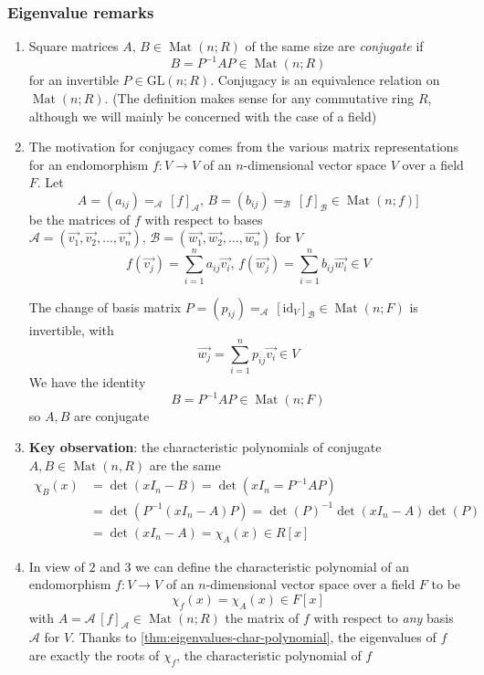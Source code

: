 \documentclass{article}
\DeclareMathOperator{\Mat}{Mat}
\begin{document}
\subsubsection{Eigenvalue remarks}
\begin{enumerate}
    \item Square matrices $A,\,B\in \Mat(n;R)$ of the same size are \textit{conjugate} if
        \[B = P^{-1}AP\in \Mat(n;R)\]
    for an invertible $P\in \text{GL}(n;R)$. Conjugacy is an equivalence relation on $\Mat(n;R)$. (The definition makes sense for any commutative ring $R$, although we will mainly be concerned with the case of a field)
    \item The motivation for conjugacy comes from the various matrix representations for an endomorphism $f : V \to V$ of an $n$-dimensional vector space $V$ over a field $F$. Let
        \[A = (a_{ij}) =_{\mathcal{A}}\,[f]_{\mathcal{A}},\,B = (b_{ij}) =_{\mathcal{B}}\,[f]_{\mathcal{B}}\in \Mat(n;f)]\]
        be the matrices of $f$ with respect to bases $\mathcal{A} = (\vec{v_{1}}, \vec{v_{2}},\dots,\vec{v_{n}}),\,\mathcal{B} = (\vec{w_{1}}, \vec{w_{2}},\dots,\vec{w_{n}})$ for $V$
        \[f(\vec{v_{j}}) = \sum_{i = 1}^{n}a_{ij}\vec{v_{i}},\,f(\vec{w_{j}}) = \sum_{i = 1}^{n}b_{ij}\vec{w_{i}}\in V\]

        The change of basis matrix $P = (p_{ij}) =_{\mathcal{A}}\, [\text{id}_{V}]_{\mathcal{B}}\in \Mat(n;F)$ is invertible, with
        \[\vec{w_{j}} = \sum_{i = 1}^{n}p_{ij}\vec{v_{i}}\in V\]
        We have the identity
        \[B = P^{-1}AP\in \Mat(n;F)\]
        so $A,B$ are conjugate
    \item \textbf{Key observation}: the characteristic polynomials of conjugate $A,B\in \Mat(n,R)$ are the same
        \begin{align*}
            \chi_{B}(x) &= \det(x I_{n} - B) = \det(x I_{n} = P^{-1}AP) \\
            &= \det(P^{-1}(x I_{n} - A)P) = \det(P)^{-1}\det(x I_{n} - A)\det(P) \\
            &= \det(xI_{n} - A) = \chi_{A}(x)\in R[x]
        \end{align*}
    \item In view of $2$ and $3$ we can define the characteristic polynomial of an endomorphism $f : V\to V$ of an $n$-dimensional vector space over a field $F$ to be
        \[\chi_{f}(x) = \chi_{A}(x)\in F[x]\]
        with $A =\mathcal{A}\,[f]_{\mathcal{A}}\in \Mat(n;R)$ the matrix of $f$ with respect to \textit{any} basis $\mathcal{A}$ for $V$. Thanks to \ref{thm:eigenvalues-char-polynomial}, the eigenvalues of $f$ are exactly the roots of $\chi_{f}$, the characteristic polynomial of $f$
\end{enumerate}
\end{document}
